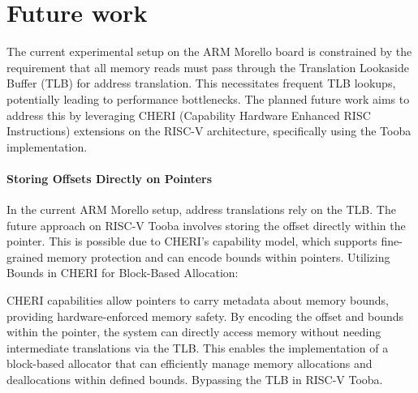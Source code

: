 \chapter{Future work}

The current experimental setup on the ARM Morello board is constrained by the requirement that all memory reads must 
pass through the Translation Lookaside Buffer (TLB) for address translation. This necessitates frequent TLB lookups, potentially 
leading to performance bottlenecks. The planned future work aims to address this by leveraging CHERI 
(Capability Hardware Enhanced RISC Instructions) extensions on the RISC-V architecture, specifically using the 
Tooba implementation\cite{noauthor_ctsrd-cheride10pro-cheri-bgas_2024}.

\subsubsection{Storing Offsets Directly on Pointers}
In the current ARM Morello setup, address translations rely on the TLB.
The future approach on RISC-V Tooba involves storing the offset directly within the pointer. This is possible due to CHERI's capability model, which supports fine-grained memory protection and can encode bounds within pointers.
Utilizing Bounds in CHERI for Block-Based Allocation:

CHERI capabilities allow pointers to carry metadata about memory bounds, providing hardware-enforced memory safety.
By encoding the offset and bounds within the pointer, the system can directly access memory without needing intermediate translations via the TLB.
This enables the implementation of a block-based allocator that can efficiently manage memory allocations and deallocations within defined bounds.
Bypassing the TLB in RISC-V Tooba.
